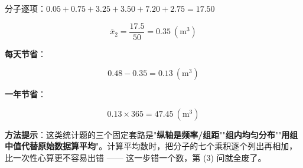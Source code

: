 \begin{answer}
分子逐项：$0.05+0.75+3.25+3.50+7.20+2.75=17.50$

\nopagebreak[4]
\[\bar x_2=\frac{17.5}{50}=0.35\ \left(\mathrm m^{3}\right)\]

\textbf{每天节省}：

\nopagebreak[4]
\[0.48-0.35=0.13\ \left(\mathrm m^{3}\right)\]

\textbf{一年节省}：

\nopagebreak[4]
\[0.13\times365=47.45\ \left(\mathrm m^{3}\right)\]

\begin{gktip}
\textbf{方法提示}：这类统计题的三个固定套路是"\textbf{纵轴是频率/组距}""\textbf{组内均匀分布}""\textbf{用组中值代替原始数据算平均}"。计算平均数时，把分子的七个乘积逐个列出再相加，比一次性心算更不容易出错 —— 这一步错一个数，第 (3) 问就全废了。
\end{gktip}




\par\medskip

\end{answer}
